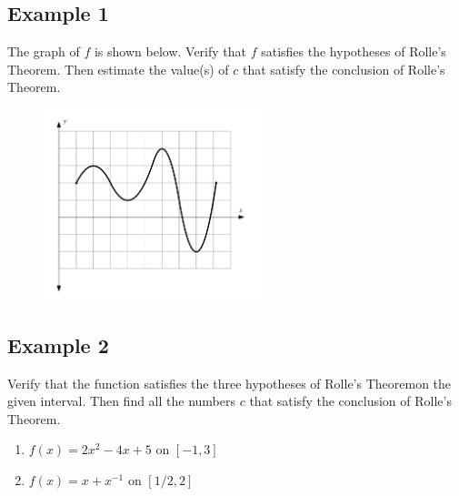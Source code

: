 \documentclass[10pt]{book}
\theoremstyle{definition}
\begin{document}
\subsection*{Example 1} The graph of $f$ is shown below. Verify that $f$ satisfies the hypotheses of Rolle's Theorem. Then estimate the value(s) of $c$ that satisfy the conclusion of Rolle's Theorem.
\begin{figure}[h]
    \includegraphics[width=2.5in]{Rolles1.png}
\end{figure}
\clearpage
\subsection*{Example 2} Verify that the function satisfies the three hypotheses of Rolle's Theoremon the given interval. Then find all the numbers $c$ that satisfy the conclusion of Rolle's Theorem.
\begin{enumerate}[label=(\alph*)]
    \item $f(x)=2x^2-4x+5$ on $[-1,3]$\vspace{5cm}
    \item $f(x)=x+x^{-1}$ on $[1/2,2]$\vspace{5cm}
\end{enumerate}
\end{document}
